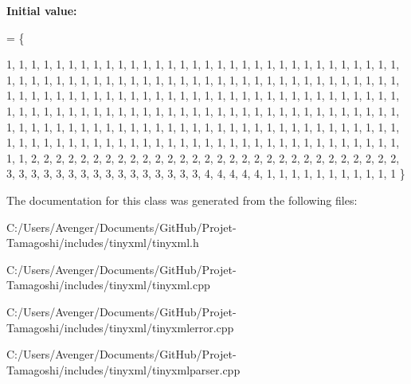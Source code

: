 {\bfseries Initial value\+:}
\begin{DoxyCode}
= 
\{
    
        1,  1,  1,  1,  1,  1,  1,  1,  1,  1,  1,  1,  1,  1,  1,  1,  
        1,  1,  1,  1,  1,  1,  1,  1,  1,  1,  1,  1,  1,  1,  1,  1,  
        1,  1,  1,  1,  1,  1,  1,  1,  1,  1,  1,  1,  1,  1,  1,  1,  
        1,  1,  1,  1,  1,  1,  1,  1,  1,  1,  1,  1,  1,  1,  1,  1,  
        1,  1,  1,  1,  1,  1,  1,  1,  1,  1,  1,  1,  1,  1,  1,  1,  
        1,  1,  1,  1,  1,  1,  1,  1,  1,  1,  1,  1,  1,  1,  1,  1,  
        1,  1,  1,  1,  1,  1,  1,  1,  1,  1,  1,  1,  1,  1,  1,  1,  
        1,  1,  1,  1,  1,  1,  1,  1,  1,  1,  1,  1,  1,  1,  1,  1,  
        1,  1,  1,  1,  1,  1,  1,  1,  1,  1,  1,  1,  1,  1,  1,  1,  
        1,  1,  1,  1,  1,  1,  1,  1,  1,  1,  1,  1,  1,  1,  1,  1,  
        1,  1,  1,  1,  1,  1,  1,  1,  1,  1,  1,  1,  1,  1,  1,  1,  
        1,  1,  1,  1,  1,  1,  1,  1,  1,  1,  1,  1,  1,  1,  1,  1,  
        1,  1,  2,  2,  2,  2,  2,  2,  2,  2,  2,  2,  2,  2,  2,  2,  
        2,  2,  2,  2,  2,  2,  2,  2,  2,  2,  2,  2,  2,  2,  2,  2,  
        3,  3,  3,  3,  3,  3,  3,  3,  3,  3,  3,  3,  3,  3,  3,  3,  
        4,  4,  4,  4,  4,  1,  1,  1,  1,  1,  1,  1,  1,  1,  1,  1   
\}
\end{DoxyCode}


The documentation for this class was generated from the following files\+:\begin{DoxyCompactItemize}
\item 
C\+:/\+Users/\+Avenger/\+Documents/\+Git\+Hub/\+Projet-\/\+Tamagoshi/includes/tinyxml/tinyxml.\+h\item 
C\+:/\+Users/\+Avenger/\+Documents/\+Git\+Hub/\+Projet-\/\+Tamagoshi/includes/tinyxml/tinyxml.\+cpp\item 
C\+:/\+Users/\+Avenger/\+Documents/\+Git\+Hub/\+Projet-\/\+Tamagoshi/includes/tinyxml/tinyxmlerror.\+cpp\item 
C\+:/\+Users/\+Avenger/\+Documents/\+Git\+Hub/\+Projet-\/\+Tamagoshi/includes/tinyxml/tinyxmlparser.\+cpp\end{DoxyCompactItemize}
